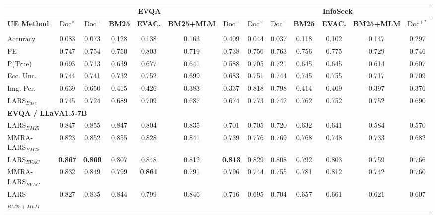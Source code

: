 \begin{table}[t]
\centering
\renewcommand{\arraystretch}{0.8}
\setlength{\tabcolsep}{1pt}
\begin{tabular}{l|cccccc|cccccc}
\hline
& \multicolumn{6}{c}{\textbf{EVQA}} & \multicolumn{6}{c}{\textbf{InfoSeek}} \\ \hline
\textbf{UE Method} & \textbf{$\text{Doc}^{\times}$} & \textbf{$\text{Doc}^{-}$} & \textbf{BM25} & \textbf{EVAC.} & \textbf{BM25+MLM} & \textbf{$\text{Doc}^{+}$} & \textbf{$\text{Doc}^{\times}$} & \textbf{$\text{Doc}^{-}$} & \textbf{BM25} & \textbf{EVAC.} & \textbf{BM25+MLM} & \textbf{$\text{Doc}^{+*}$} \\ \hline
\rowcolor{gray!20}\multicolumn{13}{l}{\textit{LLaVA1.5-7B}} \\
Accuracy & 0.083 & 0.073 & 0.128 & 0.138 & 0.163 & 0.409 & 0.044 & 0.037 & 0.118 & 0.102 & 0.147 & 0.297 \\
PE & 0.747 & 0.754 & 0.750 & 0.803 & 0.719 & 0.738 & 0.756 & 0.763 & 0.756 & 0.775 & 0.729 & 0.746 \\
P(True) & 0.693 & 0.713 & 0.639 & 0.677 & 0.641 & 0.588 & 0.705 & 0.721 & 0.645 & 0.645 & 0.614 & 0.607 \\
Ecc. Unc. & 0.744 & 0.741 & 0.732 & 0.752 & 0.699 & 0.683 & 0.751 & 0.744 & 0.745 & 0.755 & 0.717 & 0.709 \\
Img. Per. & 0.639 & 0.650 & 0.415 & 0.426 & 0.383 & 0.337 & 0.818 & 0.798 & 0.414 & 0.409 & 0.397 & 0.376 \\
LARS$_{Base}$ & 0.745 & 0.724 & 0.689 & 0.709 & 0.687 & 0.674 & 0.773 & 0.742 & 0.762 & 0.752 & 0.752 & 0.690 \\
\multicolumn{13}{l}{\hspace{0.3em}\textbf{EVQA / LLaVA1.5-7B}} \\
LARS$_{BM25}$ & 0.847 & 0.855 & 0.847 & 0.804 & 0.835 & 0.701 & 0.705 & 0.720 & 0.632 & 0.641 & 0.584 & 0.570 \\
MMRA-LARS$_{BM25}$ & 0.823 & 0.852 & 0.855 & 0.828 & 0.841 & 0.739 & 0.776 & 0.769 & 0.768 & 0.748 & 0.733 & 0.682 \\
LARS$_{EVAC}$ & \textbf{0.867} & \textbf{0.860} & 0.807 & 0.848 & 0.812 & \textbf{0.813} & 0.829 & 0.808 & 0.792 & 0.803 & 0.759 & 0.766 \\
MMRA-LARS$_{EVAC}$ & 0.832 & 0.849 & 0.799 & \textbf{0.861} & 0.791 & 0.796 & 0.744 & 0.755 & 0.781 & 0.812 & 0.742 & 0.760 \\
LARS$_{BM25+MLM}$ & 0.827 & 0.835 & 0.844 & 0.799 & 0.846 & 0.716 & 0.695 & 0.704 & 0.657 & 0.661 & 0.621 & 0.607 \\

\end{tabular}
\end{table}

